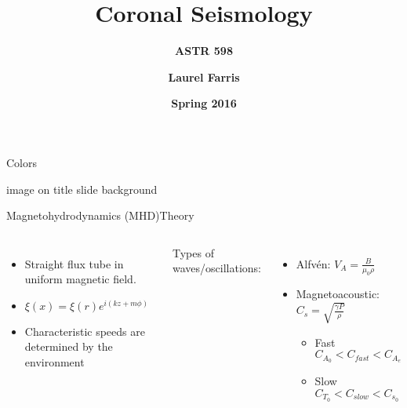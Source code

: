 \documentclass{beamer}
\title{\textbf{Coronal Seismology}}
\subtitle{\textbf{ASTR 598}}
\date{\textbf{Spring 2016}}
\author{\textbf{Laurel Farris}}
\begin{document}
\begin{frame}{Colors}


\end{frame}%
\begin{frame}{image on title slide background}
\end{frame}%
\begin{frame}{Magnetohydrodynamics (MHD)}{Theory}
    \begin{columns}
        \begin{itemize}
            \item Straight flux tube in uniform magnetic field.
            \item $ \xi(x) = \xi(r)e^{i(kz+m{\phi})} $
            \item Characteristic speeds are determined by the
                environment
        \end{itemize}
    Types of waves/oscillations:
    \begin{itemize}
        \item Alfv\'en: $V_A = \frac{B}{\mu_0\rho}$
        \item Magnetoacoustic: $C_s = \sqrt{\frac{\gamma P}{\rho}}$
            \begin{itemize}
                \item Fast $C_{A_0} < C_{fast} < C_{A_e} $
                \item Slow $C_{T_0} < C_{slow} < C_{s_0} $
            \end{itemize}
    \end{itemize}
    \end{columns}
\end{frame}%
\end{document}
